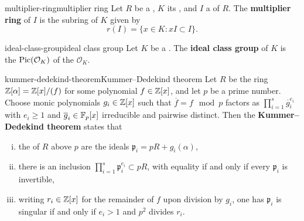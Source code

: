 \begin{topic}{multiplier-ring}{multiplier ring}
    Let $R$ be a , $K$ its , and $I$ a  of $R$. The \textbf{multiplier ring} of $I$ is the subring of $K$ given by
    \[ r(I) = \{ x \in K : x I \subset I \} . \]
\end{topic}

\begin{topic}{ideal-class-group}{ideal class group}
    Let $K$ be a . The \textbf{ideal class group} of $K$ is the  $\textup{Pic}(\mathcal{O}_K)$ of the  $\mathcal{O}_K$.
\end{topic}

\begin{topic}{kummer-dedekind-theorem}{Kummer--Dedekind theorem}
    Let $R$ be the ring $\mathbb{Z}[\alpha] = \mathbb{Z}[x] / (f)$ for some   polynomial $f \in \mathbb{Z}[x]$, and let $p$ be a prime number. Choose monic polynomials $g_i \in \mathbb{Z}[x]$ such that $\overline{f} = f \mod p$ factors as $\prod_{i = 1}^{s} \overline{g}_i^{e_i}$ with $e_i \ge 1$ and $\overline{g}_i \in \mathbb{F}_p[x]$ irreducible and pairwise distinct. Then the \textbf{Kummer--Dedekind theorem} states that
    \begin{enumerate}[(i)]
        \item the  of $R$ above $p$ are the ideals $\mathfrak{p}_i = pR + g_i(\alpha)$,
        \item there is an inclusion $\prod_{i = 1}^{s} \mathfrak{p}_i^{e_i} \subset pR$, with equality if and only if every $\mathfrak{p}_i$ is invertible,
        \item writing $r_i \in \mathbb{Z}[x]$ for the remainder of $f$ upon division by $g_i$, one has $\mathfrak{p}_i$ is singular if and only if $e_i > 1$ and $p^2$ divides $r_i$.
    \end{enumerate}
\end{topic}

